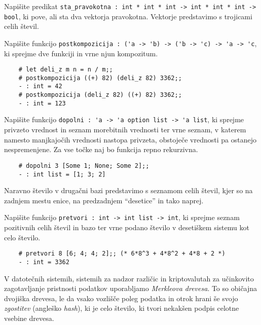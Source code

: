 \documentclass[arhiv]{../izpit}
\begin{document}
	


\naloga

\podnaloga
  Napišite predikat \verb|sta_pravokotna : int * int * int -> int * int * int -> bool|, ki pove, ali sta dva vektorja pravokotna. Vektorje predstavimo s trojicami celih števil.

\podnaloga
  Napišite funkcijo \verb|postkompozicija : ('a -> 'b) -> ('b -> 'c) -> 'a -> 'c|, ki sprejme dve funkciji in vrne njun kompozitum.
  \begin{verbatim}
    # let deli_z m n = n / m;;
    # postkompozicija ((+) 82) (deli_z 82) 3362;;
    - : int = 42
    # postkompozicija (deli_z 82) ((+) 82) 3362;;
    - : int = 123
  \end{verbatim}

\podnaloga
  Napišite funkcijo \verb|dopolni : 'a -> 'a option list -> 'a list|, ki sprejme privzeto vrednost in seznam morebitnih vrednosti ter vrne seznam, v katerem namesto manjkajočih vrednosti nastopa privzeta, obstoječe vrednosti pa ostanejo nespremenjene. Za vse točke naj bo funkcija repno rekurzivna.
  \begin{verbatim}
    # dopolni 3 [Some 1; None; Some 2];;
    - : int list = [1; 3; 2]
  \end{verbatim}

\podnaloga
  Naravno število v drugačni bazi predstavimo s seznamom celih števil, kjer so na zadnjem mestu enice, na predzadnjem ``desetice'' in tako naprej.
  
  Napišite funkcijo \verb|pretvori : int -> int list -> int|, ki sprejme seznam pozitivnih celih števil in bazo ter vrne podano število v desetiškem sistemu kot celo število.
  \begin{verbatim}
    # pretvori 8 [6; 4; 4; 2];; (* 6*8^3 + 4*8^2 + 4*8 + 2 *)
    - : int = 3362
  \end{verbatim}


\naloga

V datotečnih sistemih, sistemih za nadzor različic in kriptovalutah za učinkovito zagotavljanje pristnosti podatkov uporabljamo \emph{Merkleova drevesa}. To so običajna dvojiška drevesa, le da vsako vozlišče poleg podatka in otrok hrani še svojo \emph{zgostitev} (angleško \emph{hash}), ki je celo število, ki tvori nekakšen podpis celotne vsebine drevesa.
\end{document}
